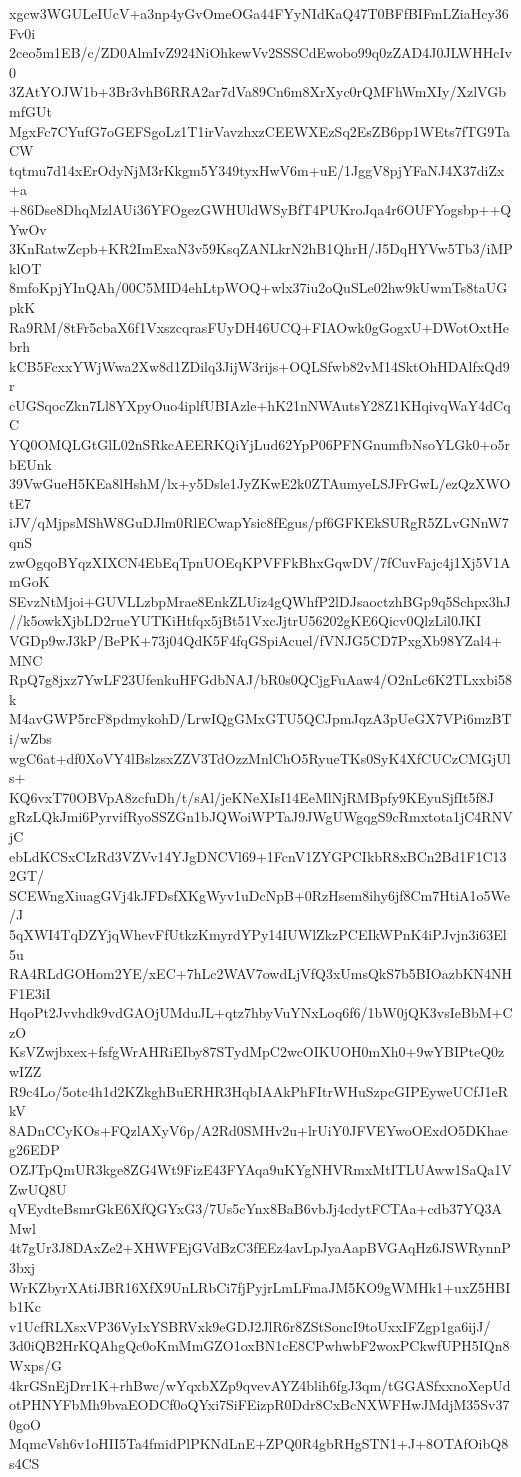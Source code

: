 xgcw3WGULeIUcV+a3np4yGvOmeOGa44FYyNIdKaQ47T0BFfBIFmLZiaHcy36Fv0i
2ceo5m1EB/c/ZD0AlmIvZ924NiOhkewVv2SSSCdEwobo99q0zZAD4J0JLWHHcIv0
3ZAtYOJW1b+3Br3vhB6RRA2ar7dVa89Cn6m8XrXyc0rQMFhWmXIy/XzlVGbmfGUt
MgxFc7CYufG7oGEFSgoLz1T1irVavzhxzCEEWXEzSq2EsZB6pp1WEts7fTG9TaCW
tqtmu7d14xErOdyNjM3rKkgm5Y349tyxHwV6m+uE/1JggV8pjYFaNJ4X37diZx+a
+86Dse8DhqMzlAUi36YFOgezGWHUldWSyBfT4PUKroJqa4r6OUFYogsbp++QYwOv
3KnRatwZcpb+KR2ImExaN3v59KsqZANLkrN2hB1QhrH/J5DqHYVw5Tb3/iMPklOT
8mfoKpjYInQAh/00C5MID4ehLtpWOQ+wlx37iu2oQuSLe02hw9kUwmTs8taUGpkK
Ra9RM/8tFr5cbaX6f1VxszcqrasFUyDH46UCQ+FIAOwk0gGogxU+DWotOxtHebrh
kCB5FcxxYWjWwa2Xw8d1ZDilq3JijW3rijs+OQLSfwb82vM14SktOhHDAlfxQd9r
cUGSqocZkn7Ll8YXpyOuo4iplfUBIAzle+hK21nNWAutsY28Z1KHqivqWaY4dCqC
YQ0OMQLGtGlL02nSRkcAEERKQiYjLud62YpP06PFNGnumfbNsoYLGk0+o5rbEUnk
39VwGueH5KEa8lHshM/lx+y5Dsle1JyZKwE2k0ZTAumyeLSJFrGwL/ezQzXWOtE7
iJV/qMjpsMShW8GuDJlm0RlECwapYsic8fEgus/pf6GFKEkSURgR5ZLvGNnW7qnS
zwOgqoBYqzXIXCN4EbEqTpnUOEqKPVFFkBhxGqwDV/7fCuvFajc4j1Xj5V1AmGoK
SEvzNtMjoi+GUVLLzbpMrae8EnkZLUiz4gQWhfP2lDJsaoctzhBGp9q5Schpx3hJ
//k5owkXjbLD2rueYUTKiHtfqx5jBt51VxcJjtrU56202gKE6Qicv0QlzLil0JKI
VGDp9wJ3kP/BePK+73j04QdK5F4fqGSpiAcuel/fVNJG5CD7PxgXb98YZal4+MNC
RpQ7g8jxz7YwLF23UfenkuHFGdbNAJ/bR0s0QCjgFuAaw4/O2nLc6K2TLxxbi58k
M4avGWP5rcF8pdmykohD/LrwIQgGMxGTU5QCJpmJqzA3pUeGX7VPi6mzBTi/wZbs
wgC6at+df0XoVY4lBslzsxZZV3TdOzzMnlChO5RyueTKs0SyK4XfCUCzCMGjUls+
KQ6vxT70OBVpA8zcfuDh/t/sAl/jeKNeXIsI14EeMlNjRMBpfy9KEyuSjfIt5f8J
gRzLQkJmi6PyrvifRyoSSZGn1bJQWoiWPTaJ9JWgUWgqgS9cRmxtota1jC4RNVjC
ebLdKCSxCIzRd3VZVv14YJgDNCVl69+1FcnV1ZYGPCIkbR8xBCn2Bd1F1C132GT/
SCEWngXiuagGVj4kJFDsfXKgWyv1uDcNpB+0RzHsem8ihy6jf8Cm7HtiA1o5We/J
5qXWI4TqDZYjqWhevFfUtkzKmyrdYPy14IUWlZkzPCEIkWPnK4iPJvjn3i63El5u
RA4RLdGOHom2YE/xEC+7hLc2WAV7owdLjVfQ3xUmsQkS7b5BIOazbKN4NHF1E3iI
HqoPt2Jvvhdk9vdGAOjUMduJL+qtz7hbyVuYNxLoq6f6/1bW0jQK3vsIeBbM+CzO
KsVZwjbxex+fsfgWrAHRiEIby87STydMpC2wcOIKUOH0mXh0+9wYBIPteQ0zwIZZ
R9c4Lo/5otc4h1d2KZkghBuERHR3HqbIAAkPhFItrWHuSzpcGIPEyweUCfJ1eRkV
8ADnCCyKOs+FQzlAXyV6p/A2Rd0SMHv2u+lrUiY0JFVEYwoOExdO5DKhaeg26EDP
OZJTpQmUR3kge8ZG4Wt9FizE43FYAqa9uKYgNHVRmxMtITLUAww1SaQa1VZwUQ8U
qVEydteBsmrGkE6XfQGYxG3/7Us5cYnx8BaB6vbJj4cdytFCTAa+cdb37YQ3AMwl
4t7gUr3J8DAxZe2+XHWFEjGVdBzC3fEEz4avLpJyaAapBVGAqHz6JSWRynnP3bxj
WrKZbyrXAtiJBR16XfX9UnLRbCi7fjPyjrLmLFmaJM5KO9gWMHk1+uxZ5HBIb1Kc
v1UcfRLXsxVP36VyIxYSBRVxk9eGDJ2JlR6r8ZStSoncI9toUxxIFZgp1ga6ijJ/
3d0iQB2HrKQAhgQc0oKmMmGZO1oxBN1cE8CPwhwbF2woxPCkwfUPH5IQn8Wxps/G
4krGSnEjDrr1K+rhBwc/wYqxbXZp9qvevAYZ4blih6fgJ3qm/tGGASfxxnoXepUd
otPHNYFbMh9bvaEODCf0oQYxi7SiFEizpR0Ddr8CxBcNXWFHwJMdjM35Sv370goO
MqmcVsh6v1oHII5Ta4fmidPlPKNdLnE+ZPQ0R4gbRHgSTN1+J+8OTAfOibQ8s4CS
